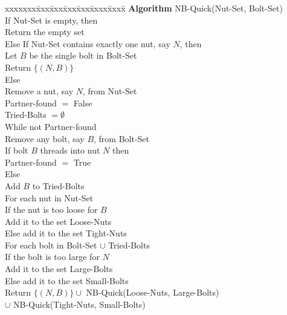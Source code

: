 \documentclass[11pt]{article}
\begin{document}
\begin{tabbing}
xxxxxxx\=xxx\=xxx\=xxx\=xxx\=xxxx\=xxxx\= \kill
\> {\bf Algorithm} NB-Quick(Nut-Set, Bolt-Set) \\
\>\> If Nut-Set is empty, then \\
\>\>\>   Return the empty set \\
\>\> Else If Nut-Set contains exactly one nut, say $N$, then \\
\>\>\>   Let $B$ be the single bolt in Bolt-Set \\
\>\>\>   Return $\{ (N,B) \}$ \\
\>\> Else \\
\>\>\>   Remove a nut, say $N$, from Nut-Set \\
\>\>\>   Partner-found $=$ False \\
\>\>\>   Tried-Bolts $= \emptyset$ \\
\>\>\>   While not Partner-found \\
\>\>\>\>    Remove any bolt, say $B$, from Bolt-Set \\
\>\>\>\>    If bolt $B$ threads into nut $N$ then \\
\>\>\>\>\>    Partner-found $=$ True \\
\>\>\>\>    Else \\
\>\>\>\>\>     Add $B$ to Tried-Bolts         \\
\>\>\>   For each nut in Nut-Set\\
\>\>\>\>    If the nut is too loose for $B$\\
\>\>\>\>\>    Add it to the set Loose-Nuts\\
\>\>\>\>  Else add it to the set Tight-Nuts\\
\>\>\>   For each bolt in Bolt-Set $\cup$ Tried-Bolts\\
\>\>\>\>    If the bolt is too large for $N$\\
\>\>\>\>\>    Add it to the set Large-Bolts\\
\>\>\>\>  Else add it to the set Small-Bolts\\
\>\>\> Return $\{ (N,B) \} \cup$ NB-Quick(Loose-Nuts, Large-Bolts)\\
\>\>\> $\cup$ NB-Quick(Tight-Nuts, Small-Bolts)
\end{tabbing}
\end{document}
